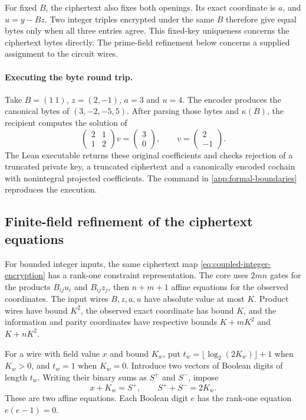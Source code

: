 For fixed \(B\), the ciphertext also fixes both openings. Its exact
coordinate is \(a\), and \(u=y-Bz\). Two integer triples encrypted under the
same \(B\) therefore give equal bytes only when all three entries agree.
This fixed-key uniqueness concerns the ciphertext bytes directly. The
prime-field refinement below concerns a supplied assignment to the circuit
wires.

\paragraph{Executing the byte round trip.}
Take \(B=(1\ 1)\), \(z=(2,-1)\), \(a=3\) and \(u=4\). The encoder produces
the canonical bytes of \((3,-2,-5,5)\). After parsing those bytes and
\(\kappa(B)\), the recipient computes the solution of
\[
 \begin{pmatrix}2&1\\1&2\end{pmatrix}v=\begin{pmatrix}3\\0\end{pmatrix},
 \qquad v=\begin{pmatrix}2\\-1\end{pmatrix}.
\]
The Lean executable returns these original coefficients and checks rejection
of a truncated private key, a truncated ciphertext and a canonically encoded
cochain with nonintegral projected coefficients. The command in
\cref{app:formal-boundaries} reproduces the execution.

\subsection{Finite-field refinement of the ciphertext equations}
\label{sec:coupled-field-refinement}

For bounded integer inputs, the same ciphertext map
\eqref{eq:coupled-integer-encryption} has a rank-one constraint
representation. The core uses \(2mn\) gates for the products
\(B_{ij}u_i\) and \(B_{ij}z_j\), then \(n+m+1\) affine equations for the
observed coordinates. The input wires \(B,z,a,u\) have absolute value at
most \(K\). Product wires have bound \(K^2\), the observed exact coordinate
has bound \(K\), and the information and parity coordinates have respective
bounds \(K+mK^2\) and \(K+nK^2\).

For a wire with field value \(x\) and bound \(K_w\), put
\(t_w=\lfloor\log_2(2K_w)\rfloor+1\) when \(K_w>0\), and \(t_w=1\)
when \(K_w=0\). Introduce two vectors of Boolean digits of length \(t_w\).
Writing their binary sums as \(S^+\) and \(S^-\), impose
\[
 x+K_w=S^+,\qquad S^++S^-=2K_w .
\]
These are two affine equations. Each Boolean digit \(e\) has the rank-one
equation \(e(e-1)=0\).

